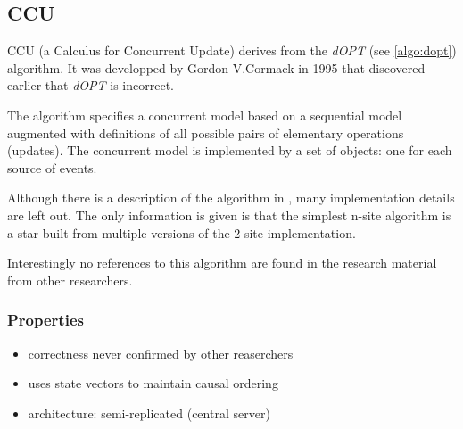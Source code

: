 \subsection{CCU}
\label{algo:ccu}

CCU (a Calculus for Concurrent Update) derives from the \emph{dOPT} (see \ref{algo:dopt}) algorithm. It was developped by Gordon V.Cormack in 1995 that discovered earlier \cite{cormack95a} that \emph{dOPT} is incorrect. 

The algorithm specifies a concurrent model based on a sequential model augmented with definitions of all possible pairs of elementary operations (updates). The concurrent model is implemented by a set of objects: one for each source of events.

Although there is a description of the algorithm in \cite{cormack95b}, many implementation details are left out. The only information is given is that the simplest n-site algorithm is a star built from multiple versions of the 2-site implementation.

Interestingly no references to this algorithm are found in the research material from other researchers. 

\subsubsection{Properties}
\begin{itemize}
 \item correctness never confirmed by other reaserchers
 \item uses state vectors to maintain causal ordering
 \item architecture: semi-replicated (central server)
\end{itemize}
